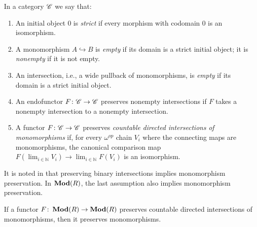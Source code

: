 \documentclass[runningheads]{llncs}
\begin{document}
\begin{definition}
  In a category $\mathscr{C}$ we say that:
\begin{enumerate}
\item
An initial object $0$ is \emph{strict} if every morphism with codomain $0$ is an
isomorphism.
\item
 A monomorphism $A \hookrightarrow B$ is \emph{empty} if its domain is a strict initial object; it is
\emph{nonempty} if it is not empty.
\item
An intersection, i.e., a wide pullback of monomorphisms, is \emph{empty} if its domain is a strict
initial object.
\item
An endofunctor $F \colon \mathscr{C} \to \mathscr{C}$ preserves nonempty intersections if $F$ takes a nonempty
intersection to a nonempty intersection.
\item
A functor $F \colon \mathscr{C} \to \mathscr{C}$ preserves \emph{countable directed intersections of monomorphisms} if, for every $\omega^{op}$ chain $V_i$ where the connecting maps are monomorphisms, the canonical comparison map $ F(\lim_{i\in \mathbb N} V_i) \to \lim_{i\in \mathbb N} F\left(V_i\right)$ is an isomorphism.
\end{enumerate}
\end{definition}
It is noted in \cite{AdamekEA25} that preserving binary intersections implies monomorphism preservation. In $\operatorname{\mathbf{Mod}}(R)$, the last assumption also implies monomorphism preservation.
\begin{propositionE}
\label{prop:monopres}
If a functor $F \colon \operatorname{\mathbf{Mod}}(R) \to \operatorname{\mathbf{Mod}}(R)$ preserves countable directed intersections of monomorphisms, then it preserves monomorphisms.
\end{propositionE}
\end{document}

